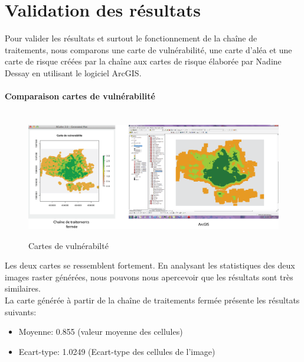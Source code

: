\section{Validation des résultats}

Pour valider les résultats et surtout le fonctionnement de la chaîne de traitements, nous comparons une carte de vulnérabilité, une carte d'aléa et une carte de risque créées par la chaîne aux cartes de risque élaborée par Nadine Dessay en utilisant le logiciel ArcGIS.

\paragraph{Comparaison cartes de vulnérabilité\\\\}

\begin{center}
\begin{figure}[h] \centering
\includegraphics[width=14cm]{VulerabiliteComp}\\
\caption{\label{VulnerabComp} Cartes de vulnérabilté }
\end{figure}
\end{center}

Les deux cartes se ressemblent fortement. En analysant les statistiques des deux images raster générées, nous pouvons nous apercevoir que les résultats sont très similaires. \\
La carte générée à partir de la chaîne de traitements fermée présente les résultats suivants:
\begin{itemize}

\item Moyenne: 0.855 (valeur moyenne des cellules)
\item Ecart-type: 1.0249 (Ecart-type des cellules de l'image)\\

\end{itemize} 

